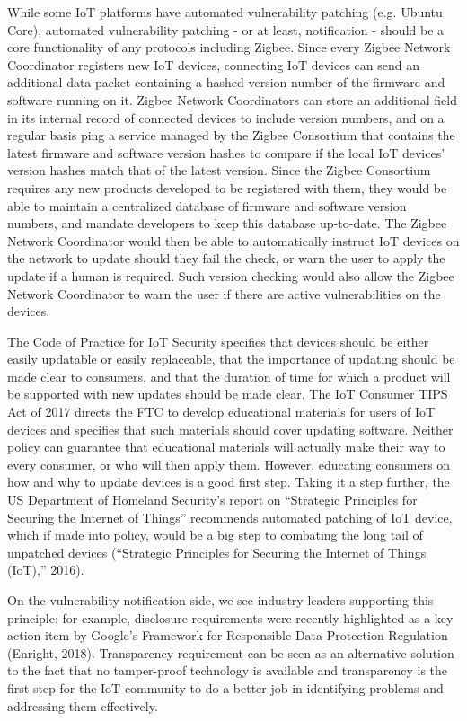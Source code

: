  While some IoT platforms have automated vulnerability patching (e.g. Ubuntu Core), automated vulnerability patching - or at least, notification - should be a core functionality of any protocols including Zigbee. Since every Zigbee Network Coordinator registers new IoT devices, connecting IoT devices can send an additional data packet containing a hashed version number of the firmware and software running on it. Zigbee Network Coordinators can store an additional field in its internal record of connected devices to include version numbers, and on a regular basis ping a service managed by the Zigbee Consortium that contains the latest firmware and software version hashes to compare if the local IoT devices’ version hashes match that of the latest version. Since the Zigbee Consortium requires any new products developed to be registered with them, they would be able to maintain a centralized database of firmware and software version numbers, and mandate developers to keep this database up-to-date. The Zigbee Network Coordinator would then be able to automatically instruct IoT devices on the network to update should they fail the check, or warn the user to apply the update if a human is required. Such version checking would also allow the Zigbee Network Coordinator to warn the user if there are active vulnerabilities on the devices.

 The Code of Practice for IoT Security specifies that devices should be either easily updatable or easily replaceable, that the importance of updating should be made clear to consumers, and that the duration of time for which a product will be supported with new updates should be made clear. The IoT Consumer TIPS Act of 2017 directs the FTC to develop educational materials for users of IoT devices and specifies that such materials should cover updating software. Neither policy can guarantee that educational materials will actually make their way to every consumer, or who will then apply them. However, educating consumers on how and why to update devices is a good first step. Taking it a step further, the US Department of Homeland Security’s report on “Strategic Principles for Securing the Internet of Things” recommends automated patching of IoT device, which if made into policy, would be a big step to combating the long tail of unpatched devices (“Strategic Principles for Securing the Internet of Things (IoT),” 2016).

On the vulnerability notification side, we see industry leaders supporting this principle; for example, disclosure requirements were recently highlighted as a key action item by Google’s Framework for Responsible Data Protection Regulation (Enright, 2018). Transparency requirement can be seen as an alternative solution to the fact that no tamper-proof technology is available and transparency is the first step for the IoT community to do a better job in identifying problems and addressing them effectively.

